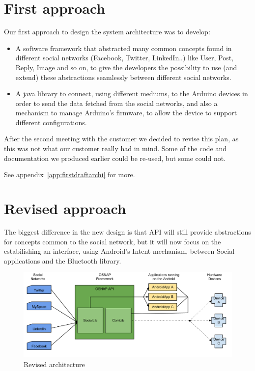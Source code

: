\section{First approach}

Our first approach to design the system architecture was to develop:

\begin{itemize}
\item A software framework that
abstracted many common concepts found in different social networks (Facebook, Twitter, LinkedIn..)
like User, Post, Reply, Image and so on, to give the developers the possibility to use
(and extend) these abstractions seamlessly between different social networks.
\end{itemize}

\begin{itemize}
\item A java library to connect, using different mediums, to the Arduino devices in order
to send the data fetched from the social networks, and also a mechanism to manage Arduino's firmware,
to allow the device to support different configurations.
\end{itemize}

After the second meeting with the customer we decided to revise this plan, as this was not what
our customer really had in mind. Some of the code and documentation we produced earlier could be re-used, but some could not.

See appendix~\ref{app:firstdraftarchi} for more.

\section{Revised approach}
The biggest difference in the new design is that API will still provide abstractions
for concepts common to the social network, but it will now focus on the estabilishing an interface,
using Android's Intent mechanism, between Social applications and the Bluetooth library.

\begin{figure}[h!]
\centering \includegraphics[scale=0.35]{img/architecture-toplevel.png}
\caption{Revised architecture}
\label{fig:architecture}
\end{figure}

